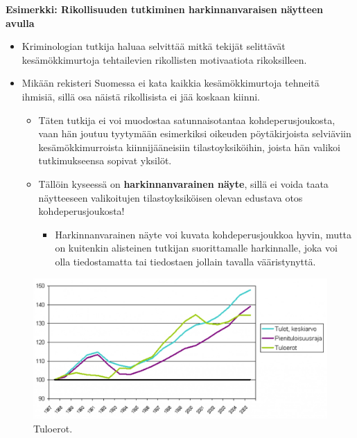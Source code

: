 \documentclass[
]{book}
\providecommand{\tightlist}{%
  \setlength{\itemsep}{0pt}\setlength{\parskip}{0pt}}
\begin{document}
\begin{eblock}{}

\textbf{Esimerkki: Rikollisuuden tutkiminen harkinnanvaraisen näytteen avulla}

\begin{itemize}
\tightlist
\item
  Kriminologian tutkija haluaa selvittää mitkä tekijät selittävät kesämökkimurtoja tehtailevien rikollisten motivaatiota rikoksilleen.
\item
  Mikään rekisteri Suomessa ei kata kaikkia kesämökkimurtoja tehneitä ihmisiä, sillä osa näistä rikollisista ei jää koskaan kiinni.

  \begin{itemize}
  \tightlist
  \item
    Täten tutkija ei voi muodostaa satunnaisotantaa kohdeperusjoukosta, vaan hän joutuu tyytymään esimerkiksi oikeuden pöytäkirjoista selviäviin kesämökkimurroista kiinnijääneisiin tilastoyksiköihin, joista hän valikoi tutkimukseensa sopivat yksilöt.
  \item
    Tällöin kyseessä on \textbf{harkinnanvarainen näyte}, sillä ei voida taata näytteeseen valikoitujen tilastoyksiköisen olevan edustava otos kohdeperusjoukosta!

    \begin{itemize}
    \tightlist
    \item
      Harkinnanvarainen näyte voi kuvata kohdeperusjoukkoa hyvin, mutta on kuitenkin alisteinen tutkijan suorittamalle harkinnalle, joka voi olla tiedostamatta tai tiedostaen jollain tavalla vääristynyttä.
    \end{itemize}
  \end{itemize}
\end{itemize}

\end{eblock}

\FloatBarrier

\begin{figure}

{\centering \includegraphics[width=1\linewidth]{images/tuloerot} 

}

\caption{Tuloerot.}\label{fig:tuloerot}
\end{figure}
\end{document}
